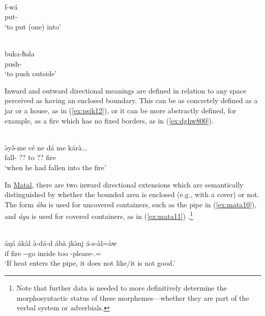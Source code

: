 \ea\label{ex:marg12}
 \\
\gll  f-wá	\\
put- \\
\glt `to put (one) into'

\ex\label{ex:bura16}
 \\
\gll  buka-ɓəla \\
push- \\
\glt `to push outside'
\z  

Inward and outward directional meanings are defined in relation to any space perceived as having an enclosed boundary. This can be as concretely defined as a jar or a house, as in (\ref{ex:psik12}), or it can be more abstractly defined, for example, as a fire which has no fixed borders, as in (\ref{ex:dghw800}).

\ea\label{ex:dghw800}
 \\
\gll ə̀yə̂-me cé ne dá me kárà... \\
fall-  ?? to ?? fire \\
\glt `when he had fallen into the fire'
\z 

In \hyperref[mata]{Matal}, there are two inward directional extensions which are semantically distinguished by whether the bounded area is enclosed (e.g., with a cover) or not. The form \textit{ába} is used for uncovered containers, such as the pipe in (\ref{ex:mata10}), and \textit{águ} is used for covered containers, as in (\ref{ex:mata11}) \citep[76]{dougopheGrammarMatal2021}.\footnote{Note that further data is needed to more definitively determine the morphosyntactic status of these morphemes---whether they are part of the verbal system or adverbials.}

\ea\label{ex:mata10}
 \\
\gll áŋá ákàl à-dá-d ábà jkə̀nj á-s-àl=àw	\\
if fire --go inside too -please-.=	\\
\glt `If heat enters the pipe, it does not like/it is not good.'

